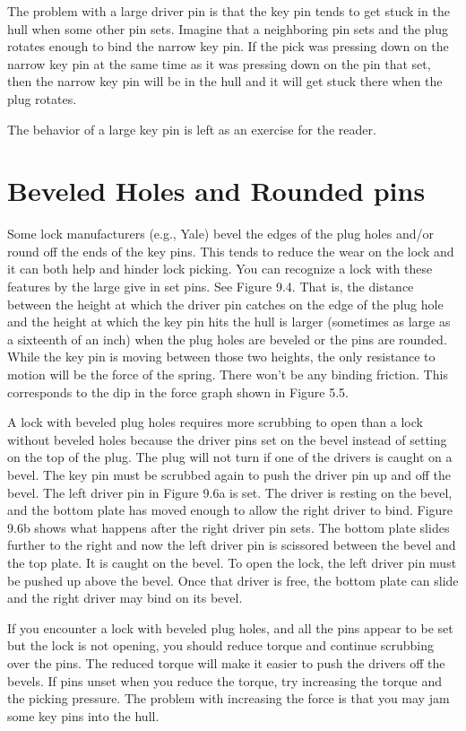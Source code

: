 The problem with a large driver pin is that the key pin tends to get stuck in the hull 
when some other pin sets. Imagine that a neighboring pin sets and the plug rotates enough 
to bind the narrow key pin. If the pick was pressing down on the narrow key pin at the same 
time as it was pressing down on the pin that set, then the narrow key pin will be in the hull 
and it will get stuck there when the plug rotates. 

The behavior of a large key pin is left as an exercise for the reader. 

\section{Beveled Holes and Rounded pins}
Some lock manufacturers (e.g., Yale) bevel the edges of the plug holes and/or round off 
the ends of the key pins. This tends to reduce the wear on the lock and it can both help 
and hinder lock picking. You can recognize a lock with these features by the large give in 
set pins. See Figure 9.4. That is, the distance between the height at which the driver pin 
catches on the edge of the plug hole and the height at which the key pin hits the hull is larger 
(sometimes as large as a sixteenth of an inch) when the plug holes are beveled or the pins 
are rounded. While the key pin is moving between those two heights, the only resistance to 
motion will be the force of the spring. There won't be any binding friction. This corresponds 
to the dip in the force graph shown in Figure 5.5. 

A lock with beveled plug holes requires more scrubbing to open than a lock without 
beveled holes because the driver pins set on the bevel instead of setting on the top of the 
plug. The plug will not turn if one of the drivers is caught on a bevel. The key pin must 
be scrubbed again to push the driver pin up and off the bevel. The left driver pin in Figure 
9.6a is set. The driver is resting on the bevel, and the bottom plate has moved enough to 
allow the right driver to bind. Figure 9.6b shows what happens after the right driver pin 
sets. The bottom plate slides further to the right and now the left driver pin is scissored 
between the bevel and the top plate. It is caught on the bevel. To open the lock, the left 
driver pin must be pushed up above the bevel. Once that driver is free, the bottom plate can 
slide and the right driver may bind on its bevel. 

If you encounter a lock with beveled plug holes, and all the pins appear to be set but the 
lock is not opening, you should reduce torque and continue scrubbing over the pins. The 
reduced torque will make it easier to push the drivers off the bevels. If pins unset when you 
reduce the torque, try increasing the torque and the picking pressure. The problem with 
increasing the force is that you may jam some key pins into the hull. 

